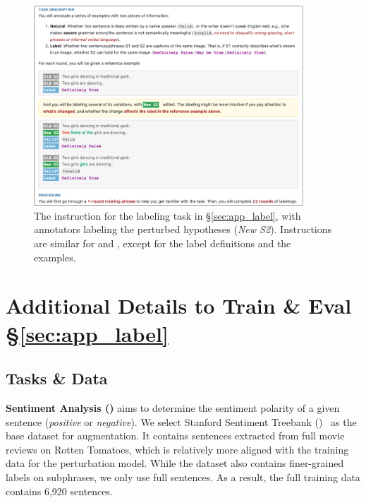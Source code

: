 \begin{figure}
\centering
\includegraphics[width=0.9\textwidth]{figures/mturk_instruction.pdf}
\vspace{-1pt}
\caption{
The instruction for the \nli labeling task in \S\ref{sec:app_label}, with annotators labeling the perturbed hypotheses (\emph{New S2}). 
Instructions are similar for \qqp and \sst, except for the label definitions and the examples.
}
\vspace{-10pt}
\label{fig:mturk_instruction}

\end{figure}




\section{Additional Details to Train \& Eval \S\ref{sec:app_label}}
\label{appendix:app_label}

\subsection{Tasks \& Data}

\textbf{Sentiment Analysis (\sst)} aims to determine the sentiment polarity of a given sentence (\emph{positive} or \emph{negative}). 
We select Stanford Sentiment Treebank (\dsst)~\cite{socher2013recursive} as the base dataset for augmentation.
It contains sentences extracted from full movie reviews on Rotten Tomatoes, which is relatively more aligned with the training data for the perturbation model. 
While the dataset also contains finer-grained labels on subphrases, we only use full sentences.
As a result, the full training data contains 6,920 sentences.

